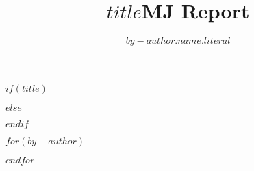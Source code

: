 
$if(title)$
  \title{$title$}
$else$
  \title{MJ Report}
$endif$




$for(by-author)$
  \author{$by-author.name.literal$\vspace{0.2cm} \newline}
$endfor$

